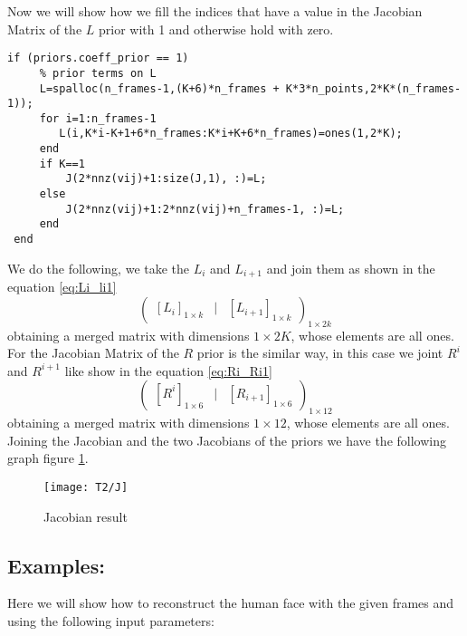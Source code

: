 \noindent Now we will show how we fill the indices that have a value in the Jacobian Matrix of the $L$ prior with 1 and otherwise hold with zero.\\
\begin{lstlisting}[style=Matlab-editor]
if (priors.coeff_prior == 1)
     % prior terms on L
     L=spalloc(n_frames-1,(K+6)*n_frames + K*3*n_points,2*K*(n_frames-1));     
     for i=1:n_frames-1
        L(i,K*i-K+1+6*n_frames:K*i+K+6*n_frames)=ones(1,2*K);        
     end
     if K==1
         J(2*nnz(vij)+1:size(J,1), :)=L;
     else
         J(2*nnz(vij)+1:2*nnz(vij)+n_frames-1, :)=L;
     end
 end 
\end{lstlisting}
\noindent We do the following, we take the $L_{i}$ and $L_{i+1}$ and join them as shown in the equation \ref{eq:Li_li1}
\begin{equation}\label{eq:Li_li1}
\begin{pmatrix}
[L_{i}]_{1\times k} & | & [L_{i+1}]_{1\times k}
\end{pmatrix}_{1\times 2k}
\end{equation}
\noindent obtaining a merged matrix with dimensions $1\times 2K$, whose elements are all ones.\\

\noindent For the Jacobian Matrix of the $R$ prior is the similar way, in this case we joint $R^{i}$ and $R^{i+1}$ like show in the equation \ref{eq:Ri_Ri1}
\begin{equation}\label{eq:Ri_Ri1}
\begin{pmatrix}
[R^{i}]_{1\times 6} & | & [R_{i+1}]_{1\times 6}
\end{pmatrix}_{1\times 12}
\end{equation}
\noindent obtaining a merged matrix with dimensions $1\times 12$, whose elements are all ones.\\
\noindent Joining the Jacobian and the two Jacobians of the priors we have the following graph figure \ref{fig:J}. 

\begin{figure}[h]
    \centering
    \texttt{[image: T2/J]}
    \caption{Jacobian result}
    \label{fig:J}
\end{figure}
\newpage
\subsection{Examples:}
\noindent Here we will show how to reconstruct the human face with the given frames and using the following input parameters:

